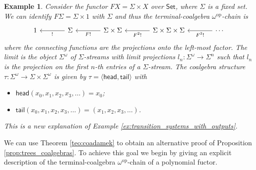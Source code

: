 \documentclass[letterpaper, 11pt, oneside]{memoir}
\theoremstyle{myteo}
\newtheorem{example}[theorem]{Example}
\numberwithin{equation}{section}
\newcommand{\head}{\textsf{head}}
\newcommand{\tail}{\textsf{tail}}
\newcommand{\Set}{\textsf{Set}}
\newcommand{\op}{\text{op}}
\newcommand{\intoprod}[2]{{\langle #1, #2\rangle}}
\begin{document}
\begin{example}
  Consider the functor \(FX = \Sigma \times X\) over \(\Set\), where \(\Sigma\) is a fixed set.
  We can identify \(F\Sigma = \Sigma \times 1\) with \(\Sigma\) and thus the terminal-coalgebra \(\omega^\op\)-chain is
  \begin{equation*}
    \begin{tikzcd}[sep = large]
      1  & \Sigma \ar[l, "!"] & \Sigma \times \Sigma  \ar[l, "F!"] & \Sigma \times \Sigma \times \Sigma \ar[l, "F^2!"] & \cdots \ar[l, "F^3!"]
    \end{tikzcd}
  \end{equation*}
  where the connecting functions are the projections onto the left-most factor.
  The limit is the object \(\Sigma^\omega\) of \(\Sigma\)-streams with limit projections \(l_n : \Sigma^\omega \to \Sigma^n\) such that \(l_n\) is the projection on the first \(n\)-th entries of a \(\Sigma\)-stream.
  The coalgebra structure \(\tau: \Sigma^\omega \to \Sigma \times \Sigma^\omega\) is given by \(\tau = \intoprod{\head}{\tail}\) with
  \begin{itemize}
  \item \(\head(x_0, x_1, x_2, x_3, \ldots) = x_0\);
  \item \(\tail(x_0, x_1, x_2, x_3, \ldots) = (x_1, x_2, x_3, \ldots)\).
  \end{itemize}
  This is a new explanation of Example \ref{ex:transition_systems_with_outputs}.
\end{example}

We can use Theorem \ref{teo:coadamek} to obtain an alternative proof of Proposition \ref{prop:trees_coalgebras}.
To achieve this goal we begin by giving an explicit description of the terminal-coalgebra \(\omega^\op\)-chain of a polynomial fuctor.
\end{document}
